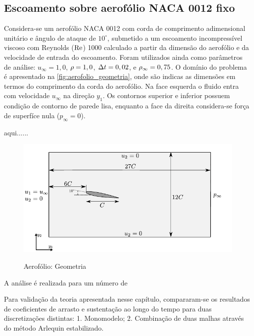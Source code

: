 \subsection{Escoamento sobre aerofólio NACA 0012 fixo} \label{capitulo:Cap6:Exemplos:NACA0012}

Considera-se um aerofólio NACA 0012 com corda de comprimento adimensional unitário e ângulo de ataque de $10^{\circ}$, submetido a um escoamento incompressível viscoso com Reynolds ($\mathrm{Re}$) 1000 calculado a partir da dimensão do aerofólio e da velocidade de entrada do escoamento. Foram utilizados ainda como parâmetros de análise: $u_{\infty} = 1,0$,  $\rho = 1,0$,  $\Delta t = 0,02$, e $\rho_\infty = 0,75$. O domínio do problema é apresentado na \autoref{fig:aerofolio_geometria}, onde são indicas as dimensões em termos do comprimento da corda do aerofólio. Na face esquerda o fluido entra com velocidade $u_{\infty}$ na direção $y_1$. Os contornos superior e inferior possuem condição de contorno de parede lisa, enquanto a face da direita considera-se força de superfíce nula ($p_\infty=0$). 

\parei aqui......

\begin{figure}[!htbp]
	\caption{Aerofólio: Geometria}
	\centering 
	{\includegraphics[scale=1.0,trim=0cm 0cm 0cm 0cm, clip=true]{Imagens/Cap6/aerofolio_geometria.pdf}}	
	\label{fig:aerofolio_geometria}
\end{figure}

A análise é realizada para um número de 

Para validação da teoria apresentada nesse capítulo, compararam-se os resultados de coeficientes de arrasto e sustentação ao longo do tempo para duas discretizações distintas: 1. Monomodelo; 2. Combinação de duas malhas através do método Arlequin estabilizado.

